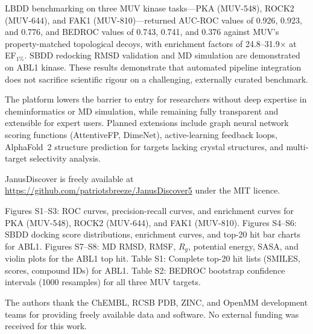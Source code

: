 \documentclass[journal=jcisd8,manuscript=article]{achemso}
\begin{document}
LBDD benchmarking on three MUV kinase tasks---PKA (MUV-548), ROCK2 (MUV-644),
and FAK1 (MUV-810)---returned AUC-ROC values of 0.926, 0.923, and 0.776,
and BEDROC values of 0.743, 0.741, and 0.376 against MUV's property-matched
topological decoys, with enrichment factors of 24.8--31.9$\times$ at EF$_{1\%}$.
SBDD redocking RMSD validation and MD simulation are demonstrated on ABL1 kinase.
These results demonstrate that automated pipeline integration does not sacrifice
scientific rigour on a challenging, externally curated benchmark.

The platform lowers the barrier to entry for researchers without deep
expertise in cheminformatics or MD simulation, while remaining fully
transparent and extensible for expert users.  Planned extensions include
graph neural network scoring functions (AttentiveFP, DimeNet),
active-learning feedback loops, AlphaFold~2 structure prediction for
targets lacking crystal structures, and multi-target selectivity analysis.

JanusDiscover is freely available at
\url{https://github.com/patriotsbreeze/JanusDiscover5}
under the MIT licence.

\begin{suppinfo}
Figures S1--S3: ROC curves, precision-recall curves, and enrichment
curves for PKA (MUV-548), ROCK2 (MUV-644), and FAK1 (MUV-810).
Figures S4--S6: SBDD docking score distributions, enrichment curves, and
top-20 hit bar charts for ABL1.
Figures S7--S8: MD RMSD, RMSF, $R_g$, potential energy, SASA, and violin
plots for the ABL1 top hit.
Table S1: Complete top-20 hit lists (SMILES, scores, compound IDs) for
ABL1.
Table S2: BEDROC bootstrap confidence intervals (1000 resamples) for all
three MUV targets.
\end{suppinfo}

\begin{acknowledgement}
The authors thank the ChEMBL, RCSB PDB, ZINC, and OpenMM development
teams for providing freely available data and software.  No external funding was received for this work.
\end{acknowledgement}

\end{document}
